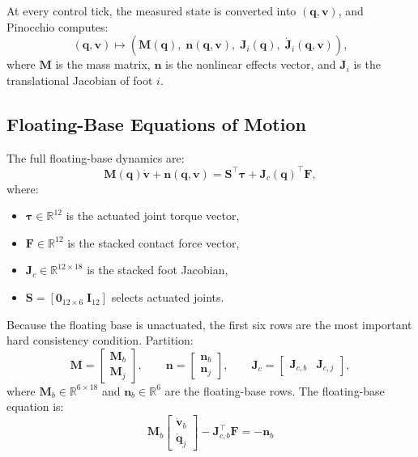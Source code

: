 \documentclass[11pt,a4paper]{article}
\newcommand{\R}{\mathbb{R}}
\begin{document}
At every control tick, the measured state is converted into $(\bm{q},\bm{v})$, and Pinocchio computes:
\begin{equation}
	(\bm{q},\bm{v})
	\longmapsto
	\left(
	\bm{M}(\bm{q}),\;
	\bm{n}(\bm{q},\bm{v}),\;
	\bm{J}_i(\bm{q}),\;
	\dot{\bm{J}}_i(\bm{q},\bm{v})
	\right),
\end{equation}
where $\bm{M}$ is the mass matrix, $\bm{n}$ is the nonlinear effects vector, and $\bm{J}_i$ is the translational Jacobian of foot $i$.

\subsection{Floating-Base Equations of Motion}

The full floating-base dynamics are:
\begin{equation}
	\bm{M}(\bm{q})\dot{\bm{v}}
	+
	\bm{n}(\bm{q},\bm{v})
	=
	\bm{S}^{\top}\bm{\tau}
	+
	\bm{J}_c(\bm{q})^{\top}\bm{F},
\end{equation}
where:
\begin{itemize}
	\item $\bm{\tau}\in\R^{12}$ is the actuated joint torque vector,
	\item $\bm{F}\in\R^{12}$ is the stacked contact force vector,
	\item $\bm{J}_c\in\R^{12\times 18}$ is the stacked foot Jacobian,
	\item $\bm{S} = [\bm{0}_{12\times 6}\;\bm{I}_{12}]$ selects actuated joints.
\end{itemize}

Because the floating base is unactuated, the first six rows are the most important hard consistency condition. Partition:
\begin{equation}
	\bm{M}
	=
	\begin{bmatrix}
		\bm{M}_b\\
		\bm{M}_j
	\end{bmatrix},
	\qquad
	\bm{n}
	=
	\begin{bmatrix}
		\bm{n}_b\\
		\bm{n}_j
	\end{bmatrix},
	\qquad
	\bm{J}_c
	=
	\begin{bmatrix}
		\bm{J}_{c,b} & \bm{J}_{c,j}
	\end{bmatrix},
\end{equation}
where $\bm{M}_b\in\R^{6\times18}$ and $\bm{n}_b\in\R^6$ are the floating-base rows. The floating-base equation is:
\begin{equation}
	\boxed{
		\bm{M}_b
		\begin{bmatrix}
			\dot{\bm{v}}_b\\
			\ddot{\bm{q}}_j
		\end{bmatrix}
		-
		\bm{J}_{c,b}^{\top}\bm{F}
		=
		-\bm{n}_b
	}
	\label{eq:floating_base_eom}
\end{equation}
\end{document}
